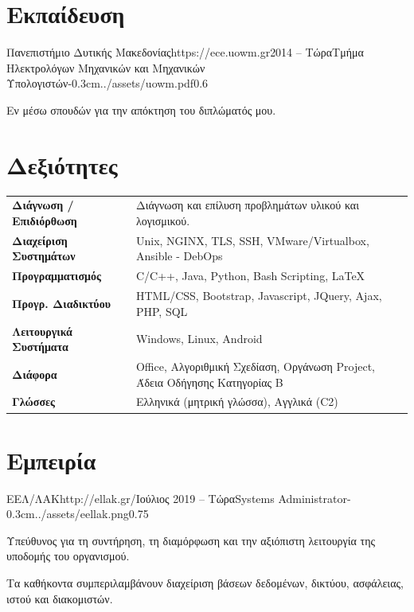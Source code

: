 \documentclass{mycv}
\begin{document}
	\section{Εκπαίδευση}
	
	\begin{EntryDatedLogo}{Πανεπιστήμιο Δυτικής Μακεδονίας}{https://ece.uowm.gr}{2014 -- Τώρα}{Τμήμα Ηλεκτρολόγων Μηχανικών και Μηχανικών Υπολογιστών}{-0.3cm}{../assets/uowm.pdf}{0.6}
	\begin{Itemize}
		\item Εν μέσω σπουδών για την απόκτηση του διπλώματός μου.
	\end{Itemize}
	\end{EntryDatedLogo}

	\section{Δεξιότητες}
	\begin{tabular}{m{4.5cm} m{13cm}}
		\textbf{Διάγνωση / Επιδιόρθωση}     & Διάγνωση και επίλυση προβλημάτων υλικού και λογισμικού. \\
		\textbf{Διαχείριση Συστημάτων}		& Unix, NGINX, TLS, SSH,  VMware/Virtualbox, Ansible - DebOps \\
		\textbf{Προγραμματισμός} 	 	  	& C/C++, Java, Python, Bash Scripting, \LaTeX \\
		\textbf{Προγρ. Διαδικτύου}	  		& HTML/CSS, Bootstrap, Javascript, JQuery, Ajax, PHP, SQL \\
		\textbf{Λειτουργικά Συστήματα}   	& Windows, Linux, Android \\
		\textbf{Διάφορα}        		 	& Office, Αλγοριθμική Σχεδίαση, Οργάνωση Project, Άδεια Οδήγησης Κατηγορίας Β \\
		\textbf{Γλώσσες} 			   		& Ελληνικά (μητρική γλώσσα), Αγγλικά (C2) 
	\end{tabular}

	\section{Εμπειρία}
	
	\begin{EntryDatedLogo}{ΕΕΛ/ΛΑΚ}{http://ellak.gr/}{Ιούλιος 2019 -- Τώρα}{Systems Administrator}{-0.3cm}{../assets/eellak.png}{0.75}
		\begin{Itemize}
			\item Υπεύθυνος για τη συντήρηση, τη διαμόρφωση και την αξιόπιστη λειτουργία της υποδομής του οργανισμού. 
			\item Τα καθήκοντα συμπεριλαμβάνουν διαχείριση βάσεων δεδομένων, δικτύου, ασφάλειας, ιστού και διακομιστών.
		\end{Itemize}
	\end{EntryDatedLogo}
\end{document}
